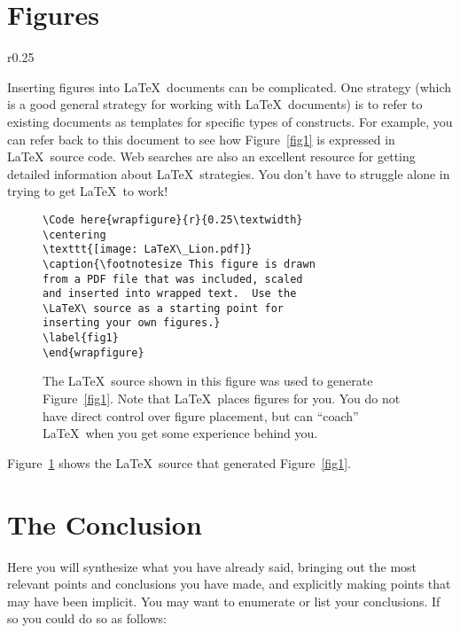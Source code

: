\documentclass{IEEEtran}
\begin{document}
\section{Figures}

\begin{wrapfigure}{r}{0.25\textwidth}

\centering
\caption{\footnotesize This figure is drawn from a PDF file that 
was included, scaled and inserted into wrapped text.  Use the \LaTeX\ 
source as a starting point for inserting your own figures.}
\label{fig1}

\end{wrapfigure}
Inserting figures into \LaTeX\ documents can be complicated.  One strategy (which is a good general strategy for working with \LaTeX\ documents) is to refer to existing documents as templates for specific types of constructs.  For example, you can refer back to this document to see how Figure~\ref{fig1} is expressed in \LaTeX\ source code. Web searches are also an excellent resource for getting detailed information about \LaTeX\ strategies.  You don't have to struggle alone in trying to get \LaTeX\ to work!


\begin{figure}[h]

\centering
\begin{mdframed}
\small
\begin{verbatim}
\Code here{wrapfigure}{r}{0.25\textwidth}
\centering
\texttt{[image: LaTeX\_Lion.pdf]}
\caption{\footnotesize This figure is drawn 
from a PDF file that was included, scaled 
and inserted into wrapped text.  Use the 
\LaTeX\ source as a starting point for 
inserting your own figures.}
\label{fig1}
\end{wrapfigure}
\end{verbatim}
\end{mdframed}
\caption{\footnotesize The \LaTeX\ source shown in this figure was used to generate Figure~\ref{fig1}.  Note that \LaTeX\ places figures for you.  You do not have direct control over figure placement, but can ``coach'' \LaTeX\ when you get some experience behind you.}
\label{fig2}
\end{figure}
Figure~\ref{fig2} shows the \LaTeX\ source that generated Figure~\ref{fig1}.


\section{The Conclusion}

Here you will synthesize what you have already said, bringing out the most relevant points and conclusions you have made, and explicitly making points that may have been implicit.  You may want to enumerate or list your conclusions.  If so you could do so as follows:
\end{document}
